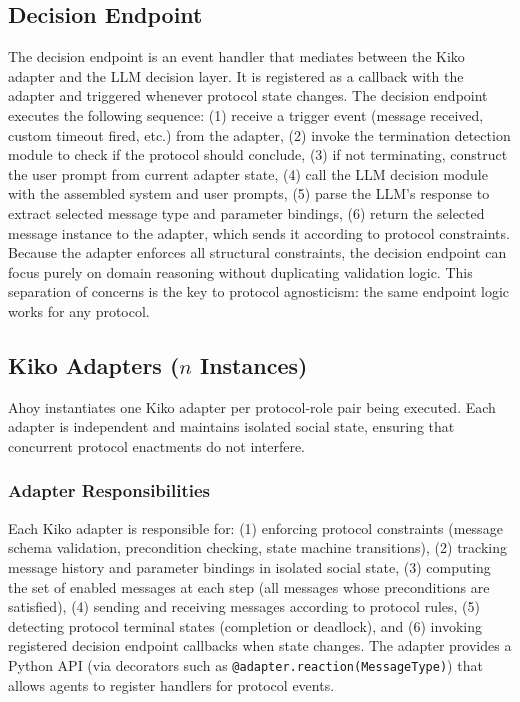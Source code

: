 \documentclass[runningheads]{llncs}
\newcommand{\ahoy}{Ahoy\xspace}
\begin{document}
\subsection{Decision Endpoint}

The decision endpoint is an event handler that mediates between the Kiko adapter and the LLM decision layer. 
It is registered as a callback with the adapter and triggered whenever protocol state changes. 
The decision endpoint executes the following sequence: (1) receive a trigger event (message received, custom timeout fired, etc.) from the adapter, (2) invoke the termination detection module to check if the protocol should conclude, (3) if not terminating, construct the user prompt from current adapter state, (4) call the LLM decision module with the assembled system and user prompts, (5) parse the LLM's response to extract selected message type and parameter bindings, (6) return the selected message instance to the adapter, which sends it according to protocol constraints. 
Because the adapter enforces all structural constraints, the decision endpoint can focus purely on domain reasoning without duplicating validation logic. 
This separation of concerns is the key to protocol agnosticism: the same endpoint logic works for any protocol.

\subsection{Kiko Adapters ($n$ Instances)}

\ahoy instantiates one Kiko adapter per protocol-role pair being executed. 
Each adapter is independent and maintains isolated social state, ensuring that concurrent protocol enactments do not interfere.

\subsubsection{Adapter Responsibilities}
Each Kiko adapter is responsible for: (1) enforcing protocol constraints (message schema validation, precondition checking, state machine transitions), (2) tracking message history and parameter bindings in isolated social state, (3) computing the set of enabled messages at each step (all messages whose preconditions are satisfied), (4) sending and receiving messages according to protocol rules, (5) detecting protocol terminal states (completion or deadlock), and (6) invoking registered decision endpoint callbacks when state changes. 
The adapter provides a Python API (via decorators such as \texttt{@adapter.reaction(MessageType)}) that allows agents to register handlers for protocol events.
\end{document}
